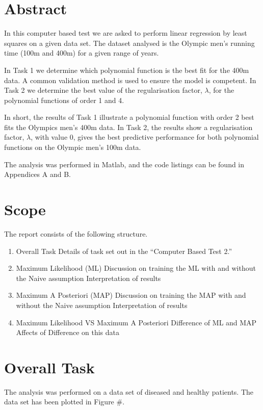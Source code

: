 \section{Abstract}
In this computer based test we are asked to perform linear regression by least squares on a given data set. The dataset analysed is the Olympic men's running time (100m and 400m) for a given range of years. 

In Task 1 we determine which polynomial function is the best fit for the 400m data. A common validation method is used to ensure the model is competent. In Task 2 we determine the best value of the regularisation factor, $\lambda$, for the polynomial functions of order 1 and 4.

In short, the results of Task 1 illustrate a polynomial function with order 2 best fits the Olympics men's 400m data. In Task 2, the results show a regularisation factor, $\lambda$, with value 0, gives the best predictive performance for both polynomial functions on the Olympic men's 100m data.

The analysis was performed in Matlab, and the code listings can be found in Appendices A and B.

\section{Scope}
The report consists of the following structure.

\begin{enumerate}
	\item Overall Task
		\subitem Details of task set out in the ``Computer Based Test 2.''
	\item Maximum Likelihood (ML)
		\subitem Discussion on training the ML with and without the Naive assumption
		\subitem Interpretation of results
	\item Maximum A Posteriori (MAP)
			\subitem Discussion on training the MAP with and without the Naive assumption
			\subitem Interpretation of results
	\item Maximum Likelihood VS Maximum A Posteriori
			\subitem Difference of ML and MAP
			\subitem Affects of Difference on this data 
\end{enumerate}

\section{Overall Task}
The analysis was performed on a data set of diseased and healthy patients. The data set has been plotted in Figure \#.

